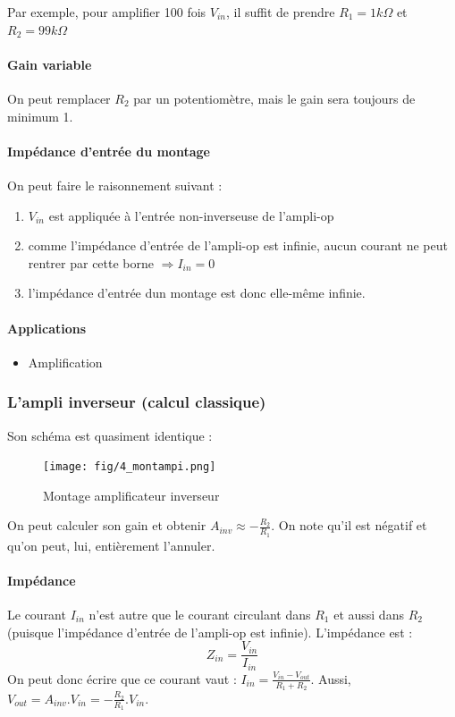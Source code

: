 \documentclass[a4paper]{article}
\begin{document}
    Par exemple, pour amplifier 100 fois $V_{in}$, il suffit de prendre $R_1 = 1k\Omega$
    et $R_2 = 99k\Omega$

    \paragraph{Gain variable}
    On peut remplacer $R_2$ par un potentiomètre, mais le gain sera toujours de
    minimum 1.

    \paragraph{Impédance d'entrée du montage}
    On peut faire le raisonnement suivant :
    \begin{enumerate}
        \item $V_{in}$ est appliquée à l'entrée non-inverseuse de l'ampli-op
        \item comme l'impédance d'entrée de l'ampli-op est infinie, aucun courant
        ne peut rentrer par cette borne $\Rightarrow I_{in} = 0$
        \item l'impédance d'entrée dun montage est donc elle-même infinie.
    \end{enumerate}

    \paragraph{Applications}
    \begin{itemize}
        \item Amplification
    \end{itemize}


    \subsubsection{L'ampli inverseur (calcul classique)}
    Son schéma est quasiment identique :
    \begin{figure}[H]
        \begin{center}
            \texttt{[image: fig/4\_montampi.png]}
            \caption{Montage amplificateur inverseur}
            \label{fig:4_montampi}
        \end{center}
    \end{figure}
    On peut calculer son gain et obtenir $A_{inv} \approx - \frac{R_2}{R_1}$. On 
    note qu'il est négatif et qu'on peut, lui, entièrement l'annuler.

    \paragraph{Impédance}
    Le courant $I_{in}$ n'est autre que le courant circulant dans $R_1$ et aussi
    dans $R_2$ (puisque l'impédance d'entrée de l'ampli-op est infinie). L'impédance est :
    $$ Z_{in} = \frac{V_{in}}{I_{in}}$$
    On peut donc écrire que ce courant vaut : $I_{in} = \frac{V_{in} - V_{out}}{R_1+R_2} $.
    Aussi, $V_{out} = A_{inv}.V_{in} = -\frac{R_2}{R_1}.V_{in} $.\\
\end{document}
